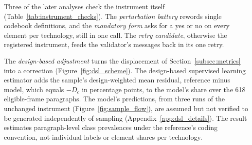 Three of the later analyses check the instrument itself (Table~\ref{tab:instrument_checks}). The \emph{perturbation battery} rewords single codebook definitions, and the \emph{mandatory form} asks for a yes or no on every element per technology, still in one call. The \emph{retry candidate}, otherwise the registered instrument, feeds the validator's messages back in its one retry.

The \emph{design-based adjustment} turns the displacement of Section~\ref{subsec:metrics} into a correction (Figure~\ref{fig:dsl_scheme}). The design-based supervised learning estimator \parencite{egami2023dsl} adds the sample's design-weighted mean residual, reference minus model, which equals $-D_c$ in percentage points, to the model's share over the 618 eligible-frame paragraphs. The model's predictions, from three runs of the unchanged instrument (Figure~\ref{fig:sample_flow}), are assumed but not verified to be generated independently of sampling (Appendix~\ref{app:dsl_details}). The result estimates paragraph-level class prevalences under the reference's coding convention, not individual labels or element shares per technology.


